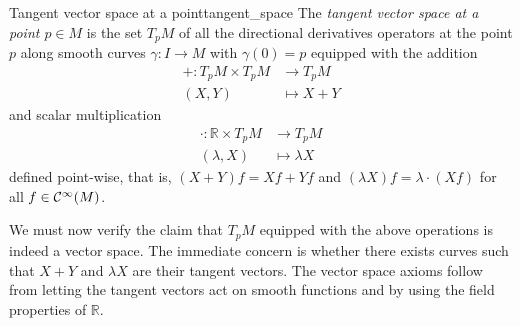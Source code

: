 \begin{definition}{Tangent vector space at a point}{tangent_space}
    The \emph{tangent vector space at a point \(p \in M\)} is the set \(T_p M\) of all the directional derivatives operators at the point \(p\) along smooth curves \(\gamma : I \to M\) with \(\gamma(0) = p\) equipped with the addition
    \begin{align*}
        + : T_pM \times T_pM &\to T_pM\\
                    (X, Y)  &\mapsto X+Y
    \end{align*}
    and scalar multiplication
    \begin{align*}
        \cdot : \mathbb{R} \times T_pM &\to T_pM\\
                    (\lambda, X)  &\mapsto \lambda X
    \end{align*}
    defined point-wise, that is, \((X+Y)f = Xf + Yf\) and \((\lambda X)f = \lambda \cdot (Xf)\) for all \(f \in \mathcal{C}^\infty(M)\).
\end{definition}

We must now verify the claim that \(T_pM\) equipped with the above operations is indeed a vector space. The immediate concern is whether there exists curves such that \(X+Y\) and \(\lambda X\) are their tangent vectors. The vector space axioms follow from letting the tangent vectors act on smooth functions and by using the field properties of \(\mathbb{R}\).

